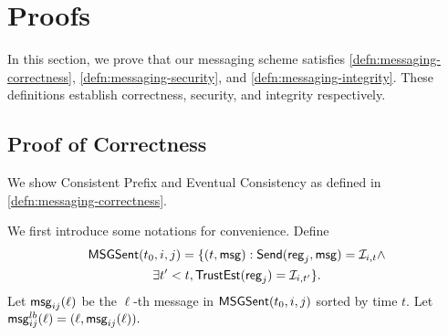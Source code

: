 \section{Proofs}
\label{sec:proofs}
In this section, we prove that our messaging scheme satisfies \cref{defn:messaging-correctness}, \cref{defn:messaging-security}, and \cref{defn:messaging-integrity}. These definitions establish correctness, security, and integrity respectively.
\subsection{Proof of Correctness}
We show Consistent Prefix and Eventual Consistency as defined in \cref{defn:messaging-correctness}.

We first introduce some notations for convenience. Define
\begin{multline*}
    \mathsf{MSGSent}(t_0, i, j) = \{(t, \mathsf{msg}): \mathsf{Send}(\mathsf{reg}_j, \mathsf{msg}) = \mathcal{I}_{i, t} \land \\
             \exists t' < t, \mathsf{TrustEst}(\mathsf{reg}_j) = \mathcal{I}_{i, t'}\}.
\end{multline*}
Let $\mathsf{msg}_{ij}(\ell)$ be the $\ell$-th message in $\mathsf{MSGSent}(t_0, i, j)$ sorted by time $t$. Let $\mathsf{msg}_{ij}^{lb}(\ell) = (\ell, \mathsf{msg}_{ij}(\ell)).$

